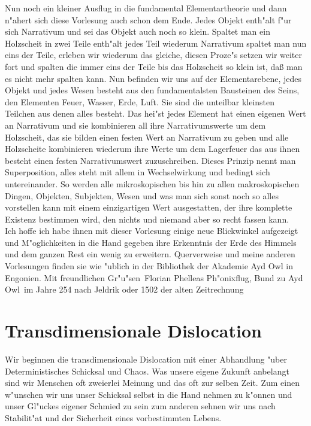 \documentclass[a5paper,8pt]{book}
\begin{document}
Nun noch ein kleiner Ausflug in die fundamental Elementartheorie und dann n"ahert sich diese Vorlesung auch schon dem Ende. Jedes Objekt enth"alt f"ur sich 
Narrativum und sei das Objekt auch noch so klein. Spaltet man ein Holzscheit in zwei Teile enth"alt jedes Teil wiederum Narrativum spaltet man nun eins der 
Teile, erleben wir wiederum das gleiche, diesen Proze"s setzen wir weiter fort und spalten die immer eins der Teile bis das Holzscheit so klein ist, daß 
man es nicht mehr spalten kann. Nun befinden wir uns auf der Elementarebene, jedes Objekt und jedes Wesen besteht aus den fundamentalsten Bausteinen des 
Seins, den Elementen Feuer, Wasser, Erde, Luft. Sie sind die unteilbar kleinsten Teilchen aus denen alles besteht. Das hei"st jedes Element hat einen 
eigenen Wert an Narrativum und sie kombinieren all ihre Narrativumswerte um dem Holzscheit, das sie bilden einen festen Wert an Narrativum zu geben und 
alle Holzscheite kombinieren wiederum ihre Werte um dem Lagerfeuer das aus ihnen besteht einen festen 
Narrativumswert zuzuschreiben. Dieses Prinzip nennt man Superposition, alles steht mit allem in Wechselwirkung und bedingt sich untereinander. So werden alle 
mikroskopischen bis hin zu allen makroskopischen Dingen, Objekten, Subjekten, Wesen und was man sich sonst noch so alles vorstellen kann mit einem 
einzigartigen Wert ausgestatten, der ihre komplette Existenz bestimmen wird, den nichts und niemand aber so recht fassen kann.\\

Ich hoffe ich habe ihnen mit dieser Vorlesung einige neue Blickwinkel aufgezeigt und M"oglichkeiten in die Hand gegeben ihre Erkenntnis der Erde des Himmels 
und dem ganzen Rest ein wenig zu erweitern. Querverweise und meine anderen Vorlesungen finden sie wie "ublich in der Bibliothek der Akademie Ayd Owl in Engonien.
\vspace{10mm}
Mit freundlichen Gr"u"sen\
Florian Phelleas Ph"onixflug, Bund zu Ayd Owl\
im Jahre 254 nach Jeldrik oder 1502 der alten Zeitrechnung\

\newpage

\section{Transdimensionale Dislocation}

Wir beginnen die transdimensionale Dislocation mit einer Abhandlung "uber Deterministisches Schicksal und Chaos. Was unsere eigene Zukunft anbelangt sind wir Menschen 
oft zweierlei Meinung und das oft zur selben Zeit. Zum einen w"unschen wir uns unser Schicksal selbst in die Hand nehmen zu k"onnen und unser Gl"uckes eigener 
Schmied zu sein zum anderen sehnen wir uns nach Stabilit"at und der Sicherheit eines vorbestimmten Lebens.\\
\end{document}
